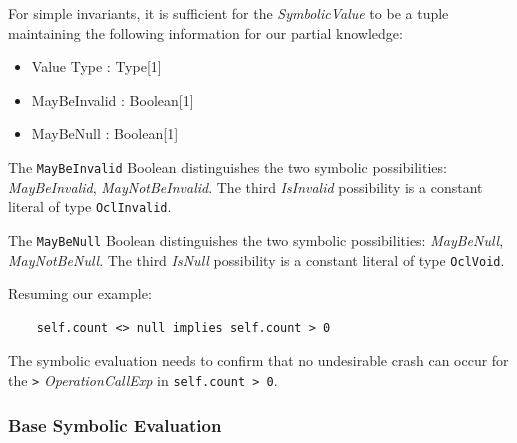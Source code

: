 \documentclass[
]{ceurart}
\begin{document}
For simple invariants, it is sufficient for the \emph{SymbolicValue} to be a tuple maintaining the following information for our partial knowledge:
\begin{itemize}
	\item Value Type : Type[1]
	\item MayBeInvalid : Boolean[1]
	\item MayBeNull : Boolean[1]
\end{itemize}

The \verb|MayBeInvalid| Boolean distinguishes the two symbolic possibilities: \emph{MayBeInvalid}, \emph{MayNotBeInvalid}. The third \emph{IsInvalid} possibility is a constant literal of type \verb|OclInvalid|.

The \verb|MayBeNull| Boolean distinguishes the two symbolic possibilities: \emph{MayBeNull}, \emph{MayNotBeNull}. The third \emph{IsNull} possibility is a constant literal of type \verb|OclVoid|.

Resuming our example:

\begin{verbatim}
    self.count <> null implies self.count > 0
\end{verbatim}

The symbolic evaluation needs to confirm that no undesirable crash can occur for the \verb|>| \emph{OperationCallExp} in \verb|self.count > 0|.

\subsubsection{Base Symbolic Evaluation}
\end{document}
